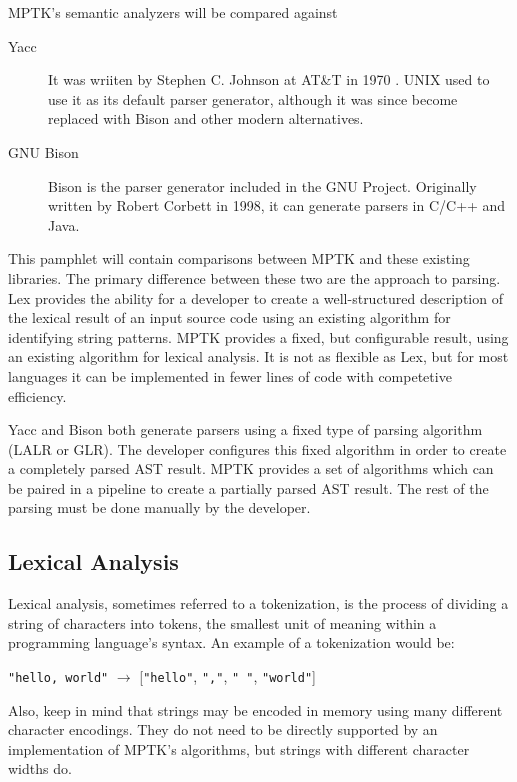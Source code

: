 \documentclass[10pt,a4paper]{article}
\begin{document}
MPTK's semantic analyzers will be compared against
\begin{description}
\item[Yacc] It was wriiten by Stephen C. Johnson at AT\&T in 1970 \cite{YACC_Book}. UNIX used to use it as its default parser generator, although it was since become replaced with Bison and other modern alternatives. 
\item[GNU Bison] Bison is the parser generator included in the GNU Project. Originally written by Robert Corbett in 1998, it can generate parsers in C/C++ and Java.
\end{description}

This pamphlet will contain comparisons between MPTK and these existing libraries. The primary difference between these two are the approach to parsing. Lex provides the ability for a developer to create a well-structured description of the lexical result of an input source code using an existing algorithm for identifying string patterns. MPTK provides a fixed, but configurable result, using an existing algorithm for lexical analysis. It is not as flexible as Lex, but for most languages it can be implemented in fewer lines of code with competetive efficiency.

Yacc \cite{YACC_Book} and Bison both generate parsers using a fixed type of parsing algorithm (LALR or GLR). The developer configures this fixed algorithm in order to create a completely parsed AST result. MPTK provides a set of algorithms which can be paired in a pipeline to create a partially parsed AST result. The rest of the parsing must be done manually by the developer.

\subsection{Lexical Analysis}
Lexical analysis, sometimes referred to a tokenization, is the process of dividing a string of characters into tokens, the smallest unit of meaning within a programming language's syntax. An example of a tokenization would be:\newline

\verb|"hello, world"| $\rightarrow$ [\verb|"hello"|, \verb|","|, \verb|" "|, \verb|"world"|]\newline

Also, keep in mind that strings may be encoded in memory using many different character encodings. They do not need to be directly supported by an implementation of MPTK's algorithms, but strings with different character widths do.
\end{document}
